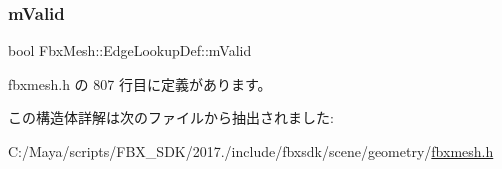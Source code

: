 \mbox{\label{struct_fbx_mesh_1_1_edge_lookup_def_a9845197a148e934eceda317c95965a68}} 
\subsubsection{\texorpdfstring{m\+Valid}{mValid}}
{\footnotesize\ttfamily bool Fbx\+Mesh\+::\+Edge\+Lookup\+Def\+::m\+Valid}



 fbxmesh.\+h の 807 行目に定義があります。



この構造体詳解は次のファイルから抽出されました\+:\begin{DoxyCompactItemize}
\item 
C\+:/\+Maya/scripts/\+F\+B\+X\+\_\+\+S\+D\+K/2017./include/fbxsdk/scene/geometry/\hyperlink{fbxmesh_8h}{fbxmesh.\+h}\end{DoxyCompactItemize}
